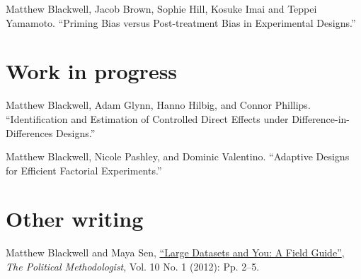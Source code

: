 \documentclass[margin,line,12pt]{res}
\begin{document}
\begin{resume}
Matthew Blackwell, Jacob Brown, Sophie Hill, Kosuke Imai and Teppei Yamamoto. ``Priming Bias versus Post-treatment Bias in Experimental Designs.'' 


\section{\sc Work in progress}





Matthew Blackwell, Adam Glynn, Hanno Hilbig, and Connor Phillips. ``Identification and Estimation of Controlled Direct Effects under Difference-in-Differences Designs.''

Matthew Blackwell, Nicole Pashley, and Dominic Valentino. ``Adaptive Designs for Efficient Factorial Experiments.''


\section{\sc Other writing}

Matthew Blackwell and Maya Sen, 
\href{http://www.mattblackwell.org/files/papers/bigdata.pdf}{``Large
  Datasets and You: A Field Guide''}, \emph{The Political
  Methodologist}, Vol. 10 No. 1 (2012): Pp. 2--5.


\end{resume}
\end{document}
